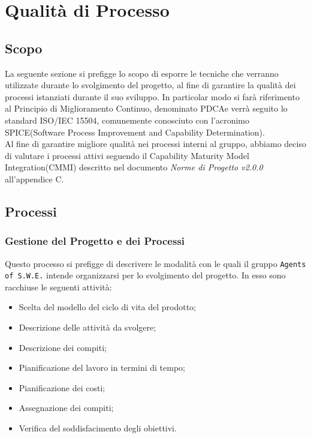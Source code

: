 \section{Qualità di Processo}
\label{qualitaProcesso}

\subsection{Scopo}

La seguente sezione si prefigge lo scopo di esporre le tecniche che verranno utilizzate durante lo svolgimento del progetto, al fine di garantire la qualità dei processi istanziati durante il suo sviluppo. In particolar modo si farà riferimento al Principio di Miglioramento Continuo, denominato PDCA\glossario e verrà seguito lo standard ISO/IEC 15504, comunemente conosciuto con l'acronimo SPICE\glossario (Software Process Improvement and Capability Determination).\\
Al fine di garantire migliore qualità nei processi interni al gruppo, abbiamo deciso di valutare i processi attivi seguendo il Capability Maturity Model Integration(CMMI) descritto nel documento \textit{Norme di Progetto v2.0.0} all'appendice C.

\subsection{Processi}
\subsubsection{Gestione del Progetto e dei Processi} 

Questo processo si prefigge di descrivere le modalità con le quali il gruppo \texttt{Agents of S.W.E.} intende organizzarsi per lo svolgimento del progetto. In esso sono racchiuse le seguenti attività:
\begin{itemize}
	\item Scelta del modello del ciclo di vita del prodotto;
	\item Descrizione delle attività da svolgere;
	\item Descrizione dei compiti;
	\item Pianificazione del lavoro in termini di tempo;
	\item Pianificazione dei costi;
	\item Assegnazione dei compiti;
	\item Verifica del soddisfacimento degli obiettivi.
\end{itemize}
\pagebreak

